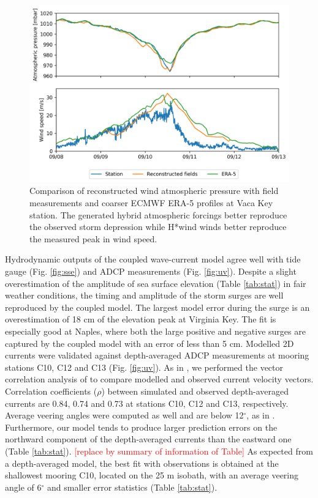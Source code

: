 \documentclass[preprint,12pt,authoryear]{elsarticle}
\begin{document}
\begin{figure}
    \centering
    \includegraphics[width=.95\textwidth]{fig/validation_met_2.png}
    \caption{Comparison of reconstructed wind atmospheric pressure with field measurements and coarser ECMWF ERA-5 profiles at Vaca Key station. The generated hybrid atmospheric forcings better reproduce the observed storm depression while H*wind winds better reproduce the measured peak in wind speed.}
    \label{fig:forcings}
\end{figure}

Hydrodynamic outputs of the coupled wave-current model agree well with tide gauge (Fig. \ref{fig:sse}) and ADCP measurements (Fig. \ref{fig:uv}). Despite a slight overestimation of the amplitude of sea surface elevation (Table \ref{tab:stat}) in fair weather conditions, the timing and amplitude of the storm surges are well reproduced by the coupled model. The largest model error during the surge is an overestimation of 18 cm of the elevation peak at Virginia Key. The fit is especially good at Naples, where both the large positive and negative surges are captured by the coupled model with an error of less than 5 cm. Modelled 2D currents were validated against depth-averaged ADCP measurements at mooring stations C10, C12 and C13 (Fig. \ref{fig:uv}). As in \cite{liu2020impacts}, we performed the vector correlation analysis of \cite{kundu1976ekman} to compare modelled and observed current velocity vectors. Correlation coefficients ($\rho$) between simulated and observed depth-averaged currents are 0.84, 0.74 and 0.73 at stations C10, C12 and C13, respectively. Average veering angles were computed as well and are below 12$^\circ$, as in \citep{liu2020impacts}. Furthermore, our model tends to produce larger prediction errors on the northward component of the depth-averaged currents than the eastward one (Table \ref{tab:stat}). \textcolor{red}{[replace by summary of information of Table]} As expected from a depth-averaged model, the best fit with observations is obtained at the shallowest mooring C10, located on the 25 m isobath, with an average veering angle of 6$^\circ$ and smaller error statistics (Table \ref{tab:stat}). 
\end{document}
